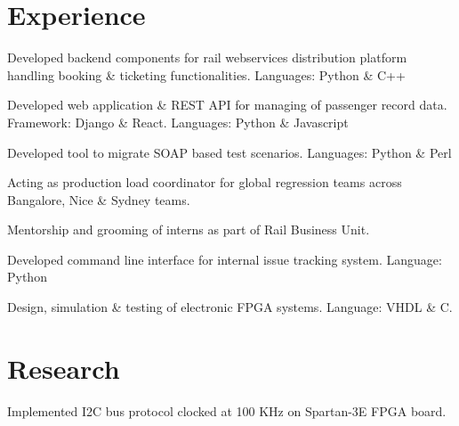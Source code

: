 \documentclass[]{Resume_Piyush}
\begin{document}
\begin{minipage}[t]{0.66\textwidth} 


\section{Experience}

\vspace{\topsep} %
\begin{tightemize}
\item Developed backend components for rail webservices distribution platform handling booking \& ticketing functionalities. Languages: Python \& C++
\item Developed web application \& REST API for managing of passenger record data. Framework: Django \& React. Languages: Python \& Javascript
\item Developed tool to migrate SOAP based test scenarios. Languages: Python \& Perl 
\item Acting as production load coordinator for global regression teams across Bangalore, Nice \& Sydney teams.
\item Mentorship and grooming of interns as part of Rail Business Unit. 
\end{tightemize}
\sectionsep

\begin{tightemize}
\item Developed command line interface for internal issue tracking system. Language: Python
\end{tightemize}
\sectionsep

\begin{tightemize}
\item Design, simulation \& testing of electronic FPGA systems. Language: VHDL \& C.
\end{tightemize}
\sectionsep


\section{Research}
Implemented I2C bus protocol clocked at 100 KHz on Spartan-3E FPGA board. 


\end{minipage}
\end{document}
